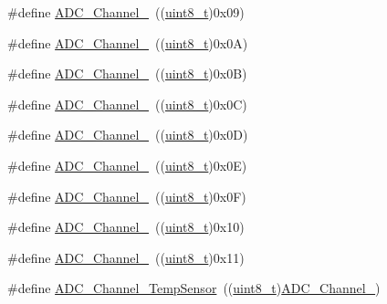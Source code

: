 \begin{DoxyCompactItemize}
\item 
\#define \hyperlink{group___a_d_c__channels_ga01a61c428be0cb69327e428e32a42aa1}{A\+D\+C\+\_\+\+Channel\+\_}~((\hyperlink{_p_e___types_8h_aba7bc1797add20fe3efdf37ced1182c5}{uint8\+\_\+t})0x09)
\item 
\#define \hyperlink{group___a_d_c__channels_gabfa98b580f49a82a83dcb1df32efceca}{A\+D\+C\+\_\+\+Channel\+\_}~((\hyperlink{_p_e___types_8h_aba7bc1797add20fe3efdf37ced1182c5}{uint8\+\_\+t})0x0\+A)
\item 
\#define \hyperlink{group___a_d_c__channels_ga5bfc40d938f384f22665f6e2dd945cfd}{A\+D\+C\+\_\+\+Channel\+\_}~((\hyperlink{_p_e___types_8h_aba7bc1797add20fe3efdf37ced1182c5}{uint8\+\_\+t})0x0\+B)
\item 
\#define \hyperlink{group___a_d_c__channels_gaa1e35f7870ae8f05013a681293175299}{A\+D\+C\+\_\+\+Channel\+\_}~((\hyperlink{_p_e___types_8h_aba7bc1797add20fe3efdf37ced1182c5}{uint8\+\_\+t})0x0\+C)
\item 
\#define \hyperlink{group___a_d_c__channels_ga517cda911256f722eb067d7140663230}{A\+D\+C\+\_\+\+Channel\+\_}~((\hyperlink{_p_e___types_8h_aba7bc1797add20fe3efdf37ced1182c5}{uint8\+\_\+t})0x0\+D)
\item 
\#define \hyperlink{group___a_d_c__channels_gaf1830a03fe4a3820fde4f41ba907c394}{A\+D\+C\+\_\+\+Channel\+\_}~((\hyperlink{_p_e___types_8h_aba7bc1797add20fe3efdf37ced1182c5}{uint8\+\_\+t})0x0\+E)
\item 
\#define \hyperlink{group___a_d_c__channels_ga01431a7b4e388beb241328874abdf88c}{A\+D\+C\+\_\+\+Channel\+\_}~((\hyperlink{_p_e___types_8h_aba7bc1797add20fe3efdf37ced1182c5}{uint8\+\_\+t})0x0\+F)
\item 
\#define \hyperlink{group___a_d_c__channels_ga52fb09ae9a0333a0e071da106466c659}{A\+D\+C\+\_\+\+Channel\+\_}~((\hyperlink{_p_e___types_8h_aba7bc1797add20fe3efdf37ced1182c5}{uint8\+\_\+t})0x10)
\item 
\#define \hyperlink{group___a_d_c__channels_ga58cdfe3a5625f198116d163b09698cea}{A\+D\+C\+\_\+\+Channel\+\_}~((\hyperlink{_p_e___types_8h_aba7bc1797add20fe3efdf37ced1182c5}{uint8\+\_\+t})0x11)
\item 
\#define \hyperlink{group___a_d_c__channels_ga1efc096b8d4a8d15c4a7d91f5c03c6c7}{A\+D\+C\+\_\+\+Channel\+\_\+\+Temp\+Sensor}~((\hyperlink{_p_e___types_8h_aba7bc1797add20fe3efdf37ced1182c5}{uint8\+\_\+t})\hyperlink{openmotestm_2library_2inc_2stm32f10x__adc_8h_a52fb09ae9a0333a0e071da106466c659}{A\+D\+C\+\_\+\+Channel\+\_})
\item 

\end{DoxyCompactItemize}
